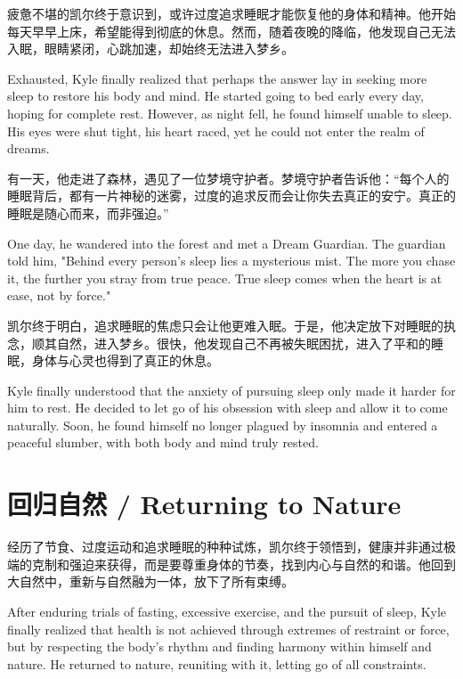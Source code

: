 疲惫不堪的凯尔终于意识到，或许过度追求睡眠才能恢复他的身体和精神。他开始每天早早上床，希望能得到彻底的休息。然而，随着夜晚的降临，他发现自己无法入眠，眼睛紧闭，心跳加速，却始终无法进入梦乡。

\begin{flushright}
Exhausted, Kyle finally realized that perhaps the answer lay in seeking more sleep to restore his body and mind. He started going to bed early every day, hoping for complete rest. However, as night fell, he found himself unable to sleep. His eyes were shut tight, his heart raced, yet he could not enter the realm of dreams.
\end{flushright}

有一天，他走进了森林，遇见了一位梦境守护者。梦境守护者告诉他：“每个人的睡眠背后，都有一片神秘的迷雾，过度的追求反而会让你失去真正的安宁。真正的睡眠是随心而来，而非强迫。”

\begin{flushright}
One day, he wandered into the forest and met a Dream Guardian. The guardian told him, "Behind every person's sleep lies a mysterious mist. The more you chase it, the further you stray from true peace. True sleep comes when the heart is at ease, not by force."
\end{flushright}

凯尔终于明白，追求睡眠的焦虑只会让他更难入眠。于是，他决定放下对睡眠的执念，顺其自然，进入梦乡。很快，他发现自己不再被失眠困扰，进入了平和的睡眠，身体与心灵也得到了真正的休息。

\begin{flushright}
Kyle finally understood that the anxiety of pursuing sleep only made it harder for him to rest. He decided to let go of his obsession with sleep and allow it to come naturally. Soon, he found himself no longer plagued by insomnia and entered a peaceful slumber, with both body and mind truly rested.
\end{flushright}

\section*{回归自然 / Returning to Nature}

经历了节食、过度运动和追求睡眠的种种试炼，凯尔终于领悟到，健康并非通过极端的克制和强迫来获得，而是要尊重身体的节奏，找到内心与自然的和谐。他回到大自然中，重新与自然融为一体，放下了所有束缚。

\begin{flushright}
After enduring trials of fasting, excessive exercise, and the pursuit of sleep, Kyle finally realized that health is not achieved through extremes of restraint or force, but by respecting the body’s rhythm and finding harmony within himself and nature. He returned to nature, reuniting with it, letting go of all constraints.
\end{flushright}

